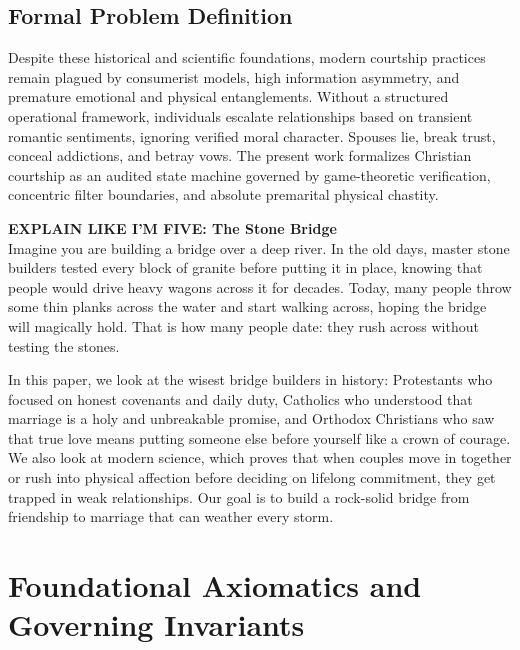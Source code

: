 \documentclass[11pt,twocolumn]{article}
\begin{document}
\subsection{Formal Problem Definition}
Despite these historical and scientific foundations, modern courtship practices remain plagued by consumerist models, high information asymmetry, and premature emotional and physical entanglements. Without a structured operational framework, individuals escalate relationships based on transient romantic sentiments, ignoring verified moral character. Spouses lie, break trust, conceal addictions, and betray vows. The present work formalizes Christian courtship as an audited state machine governed by game-theoretic verification, concentric filter boundaries, and absolute premarital physical chastity.

\begin{eli5box}
\textbf{EXPLAIN LIKE I'M FIVE: The Stone Bridge}\\
Imagine you are building a bridge over a deep river. In the old days, master stone builders tested every block of granite before putting it in place, knowing that people would drive heavy wagons across it for decades. Today, many people throw some thin planks across the water and start walking across, hoping the bridge will magically hold. That is how many people date: they rush across without testing the stones.

In this paper, we look at the wisest bridge builders in history: Protestants who focused on honest covenants and daily duty, Catholics who understood that marriage is a holy and unbreakable promise, and Orthodox Christians who saw that true love means putting someone else before yourself like a crown of courage. We also look at modern science, which proves that when couples move in together or rush into physical affection before deciding on lifelong commitment, they get trapped in weak relationships. Our goal is to build a rock-solid bridge from friendship to marriage that can weather every storm.
\end{eli5box}

\section{Foundational Axiomatics and Governing Invariants}
\end{document}
